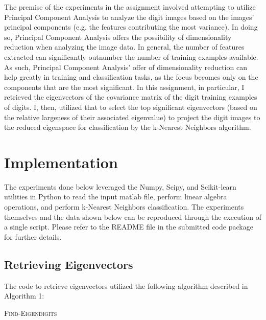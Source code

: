 \documentclass{article} %
\begin{document}
The premise of the experiments in the assignment involved attempting to utilize Principal Component Analysis to analyze the digit images based on the images' principal components (e.g. the features contributing the most variance). In doing so, Principal Component Analysis offers the possibility of dimensionality reduction when analyzing the image data. In general, the number of features extracted can significantly outnumber the number of training examples available. As such, Principal Component Analysis' offer of dimensionality reduction can help greatly in training and classification tasks, as the focus becomes only on the components that are the most significant. In this assignment, in particular, I retrieved the eigenvectors of the covariance matrix of the digit training examples of digits. I, then, utilized that to select the top significant eigenvectors (based on the relative largeness of their associated eigenvalue) to project the digit images to the reduced eigenspace for classification by the k-Nearest Neighbors algorithm.

\section{Implementation}

The experiments done below leveraged the Numpy, Scipy, and Scikit-learn utilities in Python to read the input matlab file, perform linear algebra operations, and perform k-Nearest Neighbors classification. The experiments themselves and the data shown below can be reproduced through the execution of a single script. Please refer to the README file in the submitted code package for further details. 

\subsection{Retrieving Eigenvectors}

The code to retrieve eigenvectors utilized the following algorithm described in Algorithm 1:

\begin{algorithm}
  \caption{\textsc {Find-Eigendigits} \label{IR2}}
\end{algorithm}
\end{document}
